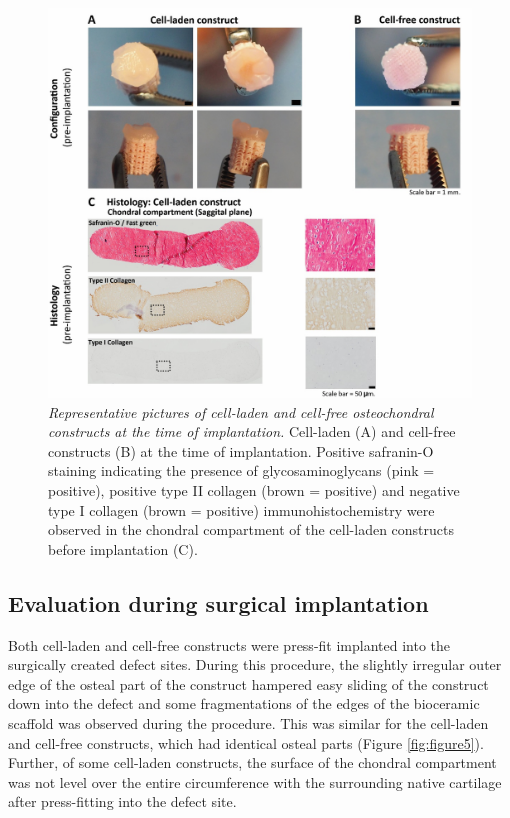 \documentclass[twocolumn, serif, empirical, authordate, seplic]{jote-article}
\begin{document}
\begin{figure}
\centering \includegraphics[width=.965\columnwidth]{articles/empirical/horse/media/image4.jpg}
\caption{\emph{Representative pictures of cell-laden and cell-free osteochondral constructs at the time of implantation.} Cell-laden (A) and cell-free constructs (B) at the time of implantation. Positive safranin-O staining indicating the presence of glycosaminoglycans (pink = positive), positive type II collagen (brown = positive) and negative type I collagen (brown = positive) immunohistochemistry were observed in the chondral compartment of the cell-laden constructs before implantation (C).}
\label{fig:figure4}\end{figure}

 {}\subsection*{Evaluation during surgical implantation} 

Both cell-laden and cell-free constructs were press-fit implanted into the surgically created defect sites. During this procedure, the slightly irregular outer edge of the osteal part of the construct hampered easy sliding of the construct down into the defect and some fragmentations of the edges of the bioceramic scaffold was observed during the procedure. This was similar for the cell-laden and cell-free constructs, which had identical osteal parts (Figure \ref{fig:figure5}). Further, of some cell-laden constructs, the surface of the chondral compartment was not level over the entire circumference with the surrounding native cartilage after press-fitting into the defect site.
\end{document}
